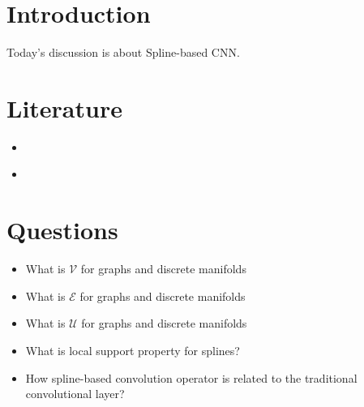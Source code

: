 \section{Introduction}

Today's discussion is about Spline-based CNN.

\section{Literature}

	\begin{itemize}
		\item ~\cite{SplineCNN}
		\item ~\cite{GeometricDL}
	\end{itemize}

\section{Questions}

\begin{itemize}
\item What is $\mathcal{V}$ for graphs and discrete manifolds
    \item What is $\mathcal{E}$ for graphs and discrete manifolds
    \item What is $\mathcal{U}$ for graphs and discrete manifolds
    \item What is local support property for splines?
    \item How spline-based convolution operator is related to the traditional convolutional layer?
\end{itemize}
